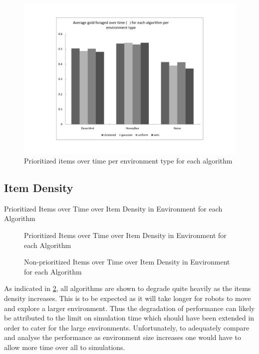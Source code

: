 \begin{figure}[!htb]
\centering
\includegraphics[width=\textwidth]{chapters/chapter6/graphs/gold_environment.pdf}
\caption{Prioritized items over time per environment type for each algorithm}
\label{environmentgoldplot}
\end{figure}


\subsection{Item Density}
\label{results:itemdensity}

\begin{table} [h]
     \caption{Prioritized Items over Time over Item Density in Environment for each Algorithm}
     \label{ratio}
	\centering
	\footnotesize
	
\end{table}

\begin{figure}[!htb]
\centering
\resizebox{\textwidth}{!}{}
\caption{Prioritized Items over Time over Item Density in Environment  for each Algorithm}
\label{objectgoldplot}
\end{figure}


\begin{figure}[!htb]
\centering
\resizebox{\textwidth}{!}{}
\caption{Non-prioritized Items over Time over Item Density in Environment for each Algorithm}
\label{objectwasteplot}
\end{figure}

As indicated in \ref{objectgoldplot}, all algorithms are shown to degrade quite heavily as the items density increases. This is to be expected as it will take longer for robots to move and explore a larger environment. Thus the degradation of performance can likely be attributed to the limit on simulation time which should have been extended in order to cater for the large environments. Unfortunately, to adequately compare and analyse the performance as environment size increases one would have to allow more time over all to simulations.

